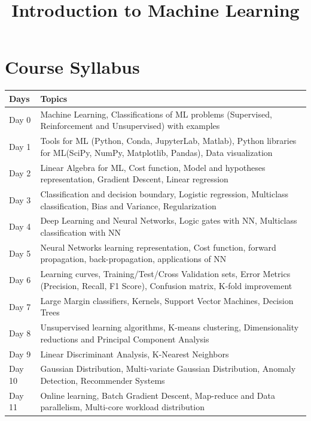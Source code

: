 \documentclass[11pt]{article}
\title{Introduction to Machine Learning}
\date{}
\begin{document}
\maketitle
\section{Course Syllabus}
\begin{center}
\begin{tabular}{|m{1.15cm}|m{15cm}|}
\hline
Days &Topics\\ \hline
Day 0 & Machine Learning, Classifications of ML problems (Supervised, Reinforcement and Unsupervised) with examples\\ \hline
Day 1 & Tools for ML (Python, Conda, JupyterLab, Matlab), Python libraries for ML(SciPy, NumPy, Matplotlib, Pandas), Data visualization\\ \hline
Day 2 & Linear Algebra for ML, Cost function, Model and hypotheses representation, Gradient Descent, Linear regression\\ \hline
Day 3 & Classification and decision boundary, Logistic regression, Multiclass classification, Bias and Variance, Regularization\\ \hline
Day 4 & Deep Learning and Neural Networks, Logic gates with NN, Multiclass classification with NN\\ \hline
Day 5 & Neural Networks learning representation, Cost function, forward propagation, back-propagation, applications of NN\\ \hline
Day 6 & Learning curves, Training/Test/Cross Validation sets, Error Metrics (Precision, Recall, F1 Score), Confusion matrix, K-fold improvement\\ \hline
Day 7 & Large Margin classifiers, Kernels, Support Vector Machines, Decision Trees\\ \hline
Day 8 & Unsupervised learning algorithms, K-means clustering, Dimensionality reductions and Principal Component Analysis\\ \hline
Day 9 & Linear Discriminant Analysis, K-Nearest Neighbors\\ \hline
Day 10 & Gaussian Distribution, Multi-variate Gaussian Distribution, Anomaly Detection, Recommender Systems\\ \hline
Day 11 & Online learning, Batch Gradient Descent, Map-reduce and Data parallelism, Multi-core workload distribution\\ \hline
\end{tabular}
\end{center}
\end{document}
